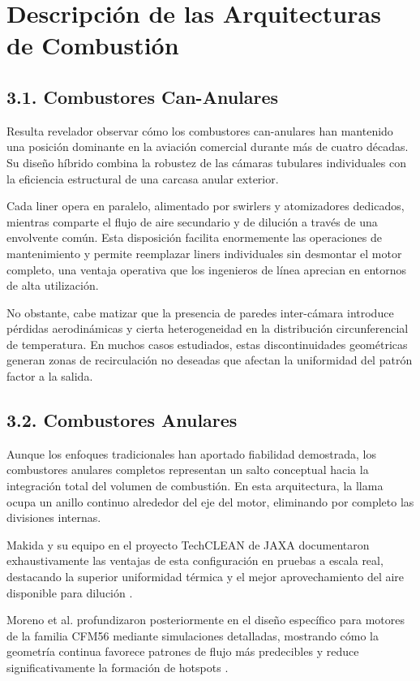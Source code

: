 \section{Descripción de las Arquitecturas de Combustión}

\subsection{3.1. Combustores Can-Anulares}

Resulta revelador observar cómo los combustores can-anulares han mantenido una posición dominante en la aviación comercial durante más de cuatro décadas. Su diseño híbrido combina la robustez de las cámaras tubulares individuales con la eficiencia estructural de una carcasa anular exterior. 

Cada liner opera en paralelo, alimentado por swirlers y atomizadores dedicados, mientras comparte el flujo de aire secundario y de dilución a través de una envolvente común. Esta disposición facilita enormemente las operaciones de mantenimiento y permite reemplazar liners individuales sin desmontar el motor completo, una ventaja operativa que los ingenieros de línea aprecian en entornos de alta utilización.

No obstante, cabe matizar que la presencia de paredes inter-cámara introduce pérdidas aerodinámicas y cierta heterogeneidad en la distribución circunferencial de temperatura. En muchos casos estudiados, estas discontinuidades geométricas generan zonas de recirculación no deseadas que afectan la uniformidad del patrón factor a la salida.

\subsection{3.2. Combustores Anulares}

Aunque los enfoques tradicionales han aportado fiabilidad demostrada, los combustores anulares completos representan un salto conceptual hacia la integración total del volumen de combustión. En esta arquitectura, la llama ocupa un anillo continuo alrededor del eje del motor, eliminando por completo las divisiones internas. 

Makida y su equipo en el proyecto TechCLEAN de JAXA documentaron exhaustivamente las ventajas de esta configuración en pruebas a escala real, destacando la superior uniformidad térmica y el mejor aprovechamiento del aire disponible para dilución \cite{Makida2008}. 

Moreno et al. profundizaron posteriormente en el diseño específico para motores de la familia CFM56 mediante simulaciones detalladas, mostrando cómo la geometría continua favorece patrones de flujo más predecibles y reduce significativamente la formación de hotspots \cite{Moreno2024}.

